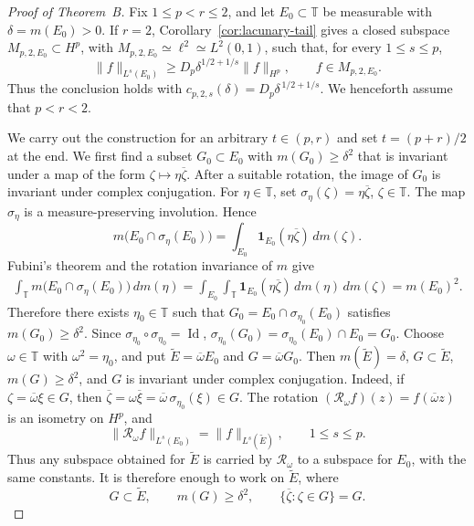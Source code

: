 \documentclass[11pt, reqno]{amsart}
\theoremstyle{definition}
\theoremstyle{remark}
\newcommand{\T}{\mathbb{T}}
\begin{document}
\begin{proof}[Proof of Theorem~B]
Fix \(1\le p<r\le2\), and let \(E_0\subset\T\) be measurable with
\(\delta=m(E_0)>0\). If \(r=2\),
Corollary~\ref{cor:lacunary-tail} gives a closed subspace
\(M_{p,2,E_0}\subset H^p\), with
\(M_{p,2,E_0}\simeq\ell^2\simeq L^2(0,1)\), such that, for every
\(1\le s\le p\),
\[
        \|f\|_{L^s(E_0)}
        \ge
        D_p\delta^{1/2+1/s}\|f\|_{H^p},
        \qquad
        f\in M_{p,2,E_0}.
\]
Thus the conclusion holds with
\(c_{p,2,s}(\delta)=D_p\delta^{\,1/2+1/s}\).  
We henceforth assume that
\(p<r<2\).

We carry out the construction for an arbitrary \(t\in(p,r)\) and
set \(t=(p+r)/2\) at the end. 
We first find a subset \(G_0\subset E_0\) with
\(m(G_0)\ge\delta^2\) that is invariant under a map of the form
\(\zeta\mapsto\eta\overline{\zeta}\). After a suitable rotation, the
image of \(G_0\) is invariant under complex conjugation. For \(\eta\in\T\), set
\(\sigma_\eta(\zeta)=\eta\overline\zeta\), \(\zeta\in\T\). The map \(\sigma_\eta\) is a measure-preserving involution.  Hence
\[
        m\bigl(E_0\cap\sigma_\eta(E_0)\bigr)
        =
        \int_{E_0}
        \mathbf1_{E_0}(\eta\overline\zeta)\,dm(\zeta).
\]
Fubini's theorem and the rotation invariance of \(m\) give
\[
\begin{aligned}
        \int_\T m\bigl(E_0\cap\sigma_\eta(E_0)\bigr)\,dm(\eta)
        =
        \int_{E_0}\int_\T
        \mathbf1_{E_0}(\eta\overline\zeta)\,dm(\eta)\,dm(\zeta)
        =
        m(E_0)^2.
\end{aligned}
\]
Therefore there exists \(\eta_0\in\T\) such that
\(G_0=E_0\cap\sigma_{\eta_0}(E_0)\) satisfies \(m(G_0)\ge\delta^2\).
Since \(\sigma_{\eta_0}\circ\sigma_{\eta_0}=\operatorname{Id}\),
\(\sigma_{\eta_0}(G_0)
=\sigma_{\eta_0}(E_0)\cap E_0=G_0\).
Choose \(\omega\in\T\) with \(\omega^2=\eta_0\), and put
\(\widetilde E=\overline\omega E_0\) and
\(G=\overline\omega G_0\). Then \(m(\widetilde E)=\delta\), \(G\subset\widetilde E\),
\(m(G)\ge\delta^2\), and \(G\) is invariant under complex conjugation.
Indeed, if \(\zeta=\overline\omega\xi\in G\), then
\(\overline\zeta
=\omega\overline\xi
=\overline\omega\,\sigma_{\eta_0}(\xi)\in G\). The rotation
\((\mathcal R_\omega f)(z)=f(\overline\omega z)\)
is an isometry on \(H^p\), and
\[
        \|\mathcal R_\omega f\|_{L^s(E_0)}
        =
        \|f\|_{L^s(\widetilde E)},
        \qquad
        1\le s\le p.
\]
Thus any subspace obtained for \(\widetilde E\) is carried by
\(\mathcal R_\omega\) to a subspace for \(E_0\), with the same
constants.  It is therefore enough to work on \(\widetilde E\), where
\[
        G\subset\widetilde E,
        \qquad
        m(G)\ge\delta^2,
        \qquad
        \{\overline\zeta:\zeta\in G\}=G.
\]


\end{proof}
\end{document}
